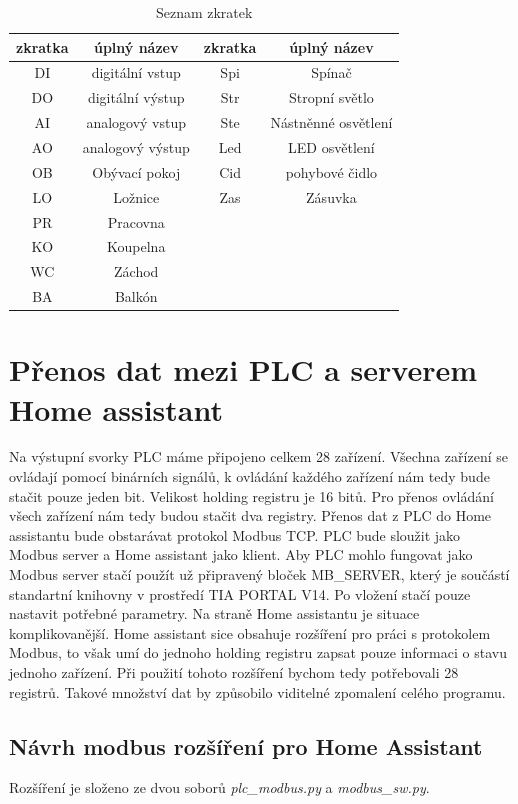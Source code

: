 \documentclass[a4paper,12pt,czech,bibliography=totoc]{scrbook}
\begin{document}
\begin{table}
	\centering
\begin{tabular}[h]{|c|c||c|c|}
	\hline
    \textbf{zkratka} & \textbf{úplný název}&\textbf{zkratka} & \textbf{úplný název}	\\
	\hline
	DI & digitální vstup & Spi & Spínač\\	\hline
	DO & digitální výstup &Str & Stropní světlo\\	\hline
	AI & analogový vstup &Ste & Nástněnné osvětlení\\	\hline
	AO & analogový výstup &Led & LED osvětlení\\	\hline
	OB & Obývací pokoj & Cid & pohybové čidlo\\	\hline
	LO & Ložnice &Zas & Zásuvka\\	\hline
	PR & Pracovna& &\\	\hline
	KO & Koupelna & &\\	\hline
	WC & Záchod & &\\	\hline
	BA & Balkón	& &\\	\hline	  
\end{tabular}
\caption{Seznam zkratek}
\label{tab:my_label}
\end{table}


\section{Přenos dat mezi PLC a serverem Home assistant}
Na výstupní svorky PLC máme připojeno celkem 28 zařízení. Všechna zařízení se ovládají pomocí binárních signálů, k ovládání každého zařízení nám tedy bude stačit pouze jeden bit. Velikost holding registru je 16 bitů. Pro přenos ovládání všech zařízení nám tedy budou stačit dva registry.
Přenos dat z PLC do Home assistantu bude obstarávat protokol Modbus TCP. PLC bude sloužit jako Modbus server a Home assistant jako klient. Aby PLC mohlo fungovat jako Modbus server stačí použít už připravený bloček MB\_SERVER, který je součástí standartní knihovny v prostředí TIA PORTAL V14. Po vložení stačí pouze nastavit potřebné parametry.
\newline
Na straně Home assistantu je situace komplikovanější. Home assistant sice obsahuje rozšíření pro práci s protokolem Modbus, to však umí do jednoho holding registru zapsat pouze informaci o stavu jednoho zařízení. Při použití tohoto rozšíření bychom tedy potřebovali 28 registrů. Takové množství dat by způsobilo viditelné zpomalení celého programu.
\subsection{Návrh modbus rozšíření pro Home Assistant}
Rozšíření je složeno ze dvou soborů \textit{plc\_modbus.py} a \textit{modbus\_sw.py}. 
\newline
\end{document}
